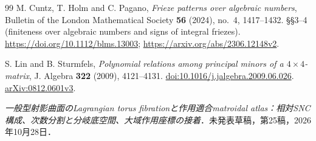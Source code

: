 \begin{thebibliography}{99}
M. Cuntz, T. Holm and C. Pagano,
\emph{Frieze patterns over algebraic numbers},
Bulletin of the London Mathematical Society \textbf{56} (2024), no.~4, 1417--1432.
\S\S3--4 (finiteness over algebraic numbers and signs of integral friezes).
\url{https://doi.org/10.1112/blms.13003};
\url{https://arxiv.org/abs/2306.12148v2}.

S. Lin and B. Sturmfels,
\emph{Polynomial relations among principal minors of a $4\times4$-matrix},
J. Algebra \textbf{322} (2009), 4121--4131.
\href{https://doi.org/10.1016/j.jalgebra.2009.06.026}{doi:10.1016/j.jalgebra.2009.06.026}.
\href{https://arxiv.org/abs/0812.0601}{arXiv:0812.0601v3}.

\emph{一般型射影曲面のLagrangian torus fibrationと作用適合matroidal atlas：相対SNC構成、次数分割と分岐底空間、大域作用座標の接着}．未発表草稿，第25稿，2026年10月28日．

\end{thebibliography}
